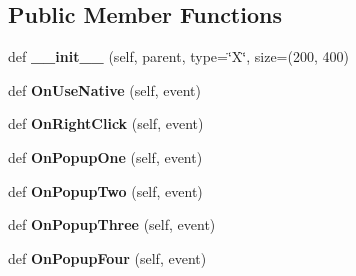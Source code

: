 \subsection*{Public Member Functions}
\begin{DoxyCompactItemize}
\item 
\hypertarget{class_uni_dec_1_1datacollector_1_1_list_ctrl_panel_ac1c85c409276f9d9edf306440acaf170}{}def {\bfseries \+\_\+\+\_\+init\+\_\+\+\_\+} (self, parent, type=\char`\"{}X\char`\"{}, size=(200, 400)\label{class_uni_dec_1_1datacollector_1_1_list_ctrl_panel_ac1c85c409276f9d9edf306440acaf170}

\item 
\hypertarget{class_uni_dec_1_1datacollector_1_1_list_ctrl_panel_a9d4304fa6cc97cd48c3fa0d5c00c952e}{}def {\bfseries On\+Use\+Native} (self, event)\label{class_uni_dec_1_1datacollector_1_1_list_ctrl_panel_a9d4304fa6cc97cd48c3fa0d5c00c952e}

\item 
\hypertarget{class_uni_dec_1_1datacollector_1_1_list_ctrl_panel_a8e24ca40c77057c14b39b4593f293403}{}def {\bfseries On\+Right\+Click} (self, event)\label{class_uni_dec_1_1datacollector_1_1_list_ctrl_panel_a8e24ca40c77057c14b39b4593f293403}

\item 
\hypertarget{class_uni_dec_1_1datacollector_1_1_list_ctrl_panel_a1c18d458c67d1e93df3baab4edd55594}{}def {\bfseries On\+Popup\+One} (self, event)\label{class_uni_dec_1_1datacollector_1_1_list_ctrl_panel_a1c18d458c67d1e93df3baab4edd55594}

\item 
\hypertarget{class_uni_dec_1_1datacollector_1_1_list_ctrl_panel_a80a1cae496cc2a211c79a44f39a8058e}{}def {\bfseries On\+Popup\+Two} (self, event)\label{class_uni_dec_1_1datacollector_1_1_list_ctrl_panel_a80a1cae496cc2a211c79a44f39a8058e}

\item 
\hypertarget{class_uni_dec_1_1datacollector_1_1_list_ctrl_panel_a6bb0009365ec5f3c45684e685376150f}{}def {\bfseries On\+Popup\+Three} (self, event)\label{class_uni_dec_1_1datacollector_1_1_list_ctrl_panel_a6bb0009365ec5f3c45684e685376150f}

\item 
\hypertarget{class_uni_dec_1_1datacollector_1_1_list_ctrl_panel_a90fd539db998fb4635319a508bf66114}{}def {\bfseries On\+Popup\+Four} (self, event)\label{class_uni_dec_1_1datacollector_1_1_list_ctrl_panel_a90fd539db998fb4635319a508bf66114}

\end{DoxyCompactItemize}
